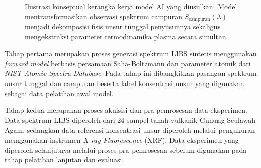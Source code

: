 \begin{figure}[H]
{
    }
    \caption{Ilustrasi konseptual kerangka kerja model AI yang diusulkan. Model mentransformasikan observasi spektrum campuran $S_{\mathrm{campuran}}(\lambda)$ menjadi dekomposisi fisis unsur tunggal penyusunnya sekaligus mengekstraksi parameter termodinamika plasma secara simultan.}
    \label{fig:arsitektur_konseptual}
\end{figure}

Tahap pertama merupakan proses generasi spektrum LIBS sintetis menggunakan \textit{forward model} berbasis persamaan Saha-Boltzmann dan parameter atomik dari \textit{NIST Atomic Spectra Database}. Pada tahap ini dibangkitkan pasangan spektrum unsur tunggal dan campuran beserta label konsentrasi unsur yang digunakan sebagai data pelatihan awal model.

Tahap kedua merupakan proses akuisisi dan pra-pemrosesan data eksperimen. Data spektrum LIBS diperoleh dari 24 sampel tanah vulkanik Gunung Seulawah Agam, sedangkan data referensi konsentrasi unsur diperoleh melalui pengukuran menggunakan instrumen \textit{X-ray Fluorescence} (XRF). Data eksperimen yang diperoleh selanjutnya melalui proses pra-pemrosesan sebelum digunakan pada tahap pelatihan lanjutan dan evaluasi.


